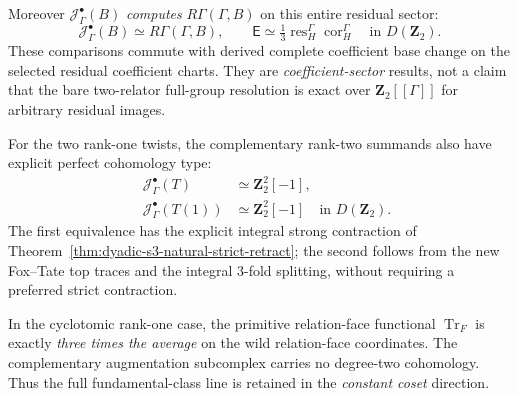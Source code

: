 \begin{theorem}
Moreover
$\mathcal J_\Gamma^\bullet(B)$
\emph{computes}
$R\Gamma(\Gamma,B)$
on this entire
residual sector:
\begin{equation}\label{eq:dyadic-f134-sectorwise-full-marked-completeness}
\boxed{\quad
\mathcal J_\Gamma^\bullet(B)
\simeq R\Gamma(\Gamma,B),
\qquad
\mathsf E
\simeq\tfrac13
\operatorname{res}_H^\Gamma
\operatorname{cor}_H^\Gamma
\quad\text{in }D(\mathbf Z_2).
\quad}
\end{equation}
These comparisons
commute with
derived complete
coefficient base change
on the selected
residual coefficient
charts.
They are
\emph{coefficient-sector}
results, not a
claim that the
bare two-relator
full-group
resolution is
exact over
$\mathbf Z_2[[\Gamma]]$
for arbitrary
residual images.

For the two
rank-one twists,
the complementary
rank-two summands
also have explicit
perfect cohomology
type:
\begin{equation}\label{eq:dyadic-f134-augmented-tate-ledger}
\boxed{\quad
\begin{aligned}
\mathcal J_\Gamma^\bullet(T)
&\simeq\mathbf Z_2^2[-1],\\
\mathcal J_\Gamma^\bullet(T(1))
&\simeq\mathbf Z_2^2[-1]
\quad\text{in }D(\mathbf Z_2).
\end{aligned}}
\end{equation}
The first equivalence
has the explicit
integral strong
contraction of
Theorem~\ref{thm:dyadic-s3-natural-strict-retract};
the second follows
from the new
Fox--Tate
top traces and
the integral
$3$-fold splitting,
without requiring
a preferred
strict contraction.

In the cyclotomic
rank-one case,
the primitive
relation-face
functional
$\operatorname{Tr}_F$
is exactly
\emph{three times
the average}
on the wild
relation-face
coordinates.
The complementary
augmentation
subcomplex carries
no degree-two
cohomology.
Thus the full
fundamental-class
line is retained
in the
\emph{constant
coset} direction.
\end{theorem}

